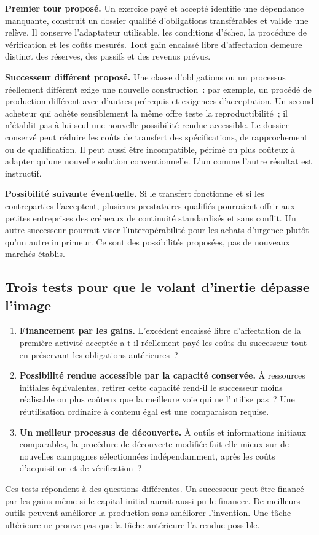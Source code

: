 \documentclass[11pt,a4paper]{article}
\begin{document}
\textbf{Premier tour proposé.} Un exercice payé et accepté identifie une dépendance manquante, construit un dossier qualifié d’obligations transférables et valide une relève. Il conserve l’adaptateur utilisable, les conditions d’échec, la procédure de vérification et les coûts mesurés. Tout gain encaissé libre d’affectation demeure distinct des réserves, des passifs et des revenus prévus.

\textbf{Successeur différent proposé.} Une classe d’obligations ou un processus réellement différent exige une nouvelle construction~: par exemple, un procédé de production différent avec d’autres prérequis et exigences d’acceptation. Un second acheteur qui achète sensiblement la même offre teste la reproductibilité~; il n’établit pas à lui seul une nouvelle possibilité rendue accessible. Le dossier conservé peut réduire les coûts de transfert des spécifications, de rapprochement ou de qualification. Il peut aussi être incompatible, périmé ou plus coûteux à adapter qu’une nouvelle solution conventionnelle. L’un comme l’autre résultat est instructif.

\textbf{Possibilité suivante éventuelle.} Si le transfert fonctionne et si les contreparties l’acceptent, plusieurs prestataires qualifiés pourraient offrir aux petites entreprises des créneaux de continuité standardisés et sans conflit. Un autre successeur pourrait viser l’interopérabilité pour les achats d’urgence plutôt qu’un autre imprimeur. Ce sont des possibilités proposées, pas de nouveaux marchés établis.

\subsection{Trois tests pour que le volant d’inertie dépasse l’image}
\begin{enumerate}
\item \textbf{Financement par les gains.} L’excédent encaissé libre d’affectation de la première activité acceptée a-t-il réellement payé les coûts du successeur tout en préservant les obligations antérieures~?
\item \textbf{Possibilité rendue accessible par la capacité conservée.} À ressources initiales équivalentes, retirer cette capacité rend-il le successeur moins réalisable ou plus coûteux que la meilleure voie qui ne l’utilise pas~? Une réutilisation ordinaire à contenu égal est une comparaison requise.
\item \textbf{Un meilleur processus de découverte.} À outils et informations initiaux comparables, la procédure de découverte modifiée fait-elle mieux sur de nouvelles campagnes sélectionnées indépendamment, après les coûts d’acquisition et de vérification~?
\end{enumerate}
Ces tests répondent à des questions différentes. Un successeur peut être financé par les gains même si le capital initial aurait aussi pu le financer. De meilleurs outils peuvent améliorer la production sans améliorer l’invention. Une tâche ultérieure ne prouve pas que la tâche antérieure l’a rendue possible.
\end{document}
